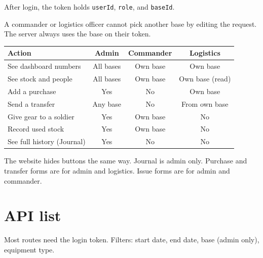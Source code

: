\documentclass[11pt,a4paper]{article}
\begin{document}
After login, the token holds \texttt{userId}, \texttt{role}, and \texttt{baseId}.

A commander or logistics officer cannot pick another base by editing the request. The server always uses the base on their token.

\begin{center}
\small
\begin{tabular}{>{\raggedright\arraybackslash}p{4.6cm}ccc}
\toprule
\textbf{Action} & \textbf{Admin} & \textbf{Commander} & \textbf{Logistics} \\
\midrule
See dashboard numbers & All bases & Own base & Own base \\
See stock and people & All bases & Own base & Own base (read) \\
Add a purchase & Yes & No & Own base \\
Send a transfer & Any base & No & From own base \\
Give gear to a soldier & Yes & Own base & No \\
Record used stock & Yes & Own base & No \\
See full history (Journal) & Yes & No & No \\
\bottomrule
\end{tabular}
\end{center}

The website hides buttons the same way. Journal is admin only. Purchase and transfer forms are for admin and logistics. Issue forms are for admin and commander.

\section{API list}

Most routes need the login token. Filters: start date, end date, base (admin only), equipment type.
\end{document}

